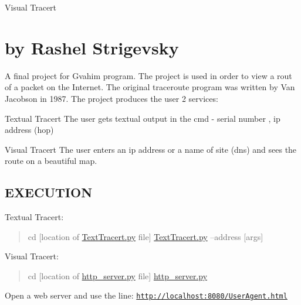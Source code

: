 Visual Tracert \section*{by Rashel Strigevsky }

A final project for Gvahim program. The project is used in order to view a rout of a packet on the Internet. The original traceroute program was written by Van Jacobson in 1987. The project produces the user 2 services\+:
\begin{DoxyItemize}
\item Textual Tracert The user gets textual output in the cmd -\/ serial number , ip address (hop)
\item Visual Tracert The user enters an ip address or a name of site (dns) and sees the route on a beautiful map.
\end{DoxyItemize}

\subsection*{E\+X\+E\+C\+U\+T\+I\+ON }

Textual Tracert\+:

\begin{quote}
cd \mbox{[}location of \hyperlink{_text_tracert_8py}{Text\+Tracert.\+py} file\mbox{]} \hyperlink{_text_tracert_8py}{Text\+Tracert.\+py} --address \mbox{[}args\mbox{]} \end{quote}


Visual Tracert\+:

\begin{quote}
cd \mbox{[}location of \hyperlink{http__server_8py}{http\+\_\+server.\+py} file\mbox{]} \hyperlink{http__server_8py}{http\+\_\+server.\+py} \end{quote}


Open a web server and use the line\+: \href{http://localhost:8080/UserAgent.html}{\tt http\+://localhost\+:8080/\+User\+Agent.\+html} 